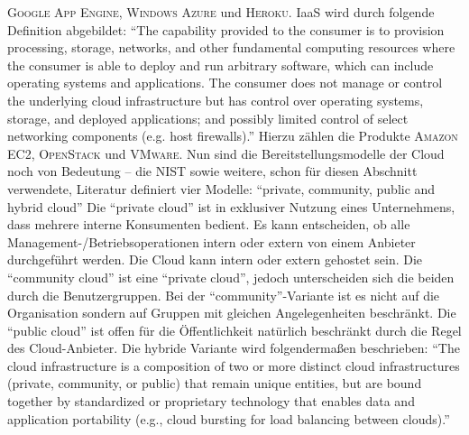 \textsc{Google App Engine}, \textsc{Windows Azure} und \textsc{Heroku}.\autocite[vgl.][S.8]{kumar_reliability_2018} \ac{IaaS} wird durch folgende Definition abgebildet: \enquote{The capability provided to the consumer is to provision processing, storage, networks, and other fundamental computing resources where the consumer is able to deploy and run arbitrary software, which can include operating systems and applications. The consumer does not manage or control the underlying cloud infrastructure but has control over operating systems, storage, and deployed applications; and possibly limited control of select networking components (e.g. host firewalls).}\autocite[][S.3]{mell_nist_2011} Hierzu zählen die Produkte \textsc{Amazon EC2}, \textsc{OpenStack} und \textsc{VMware}. Nun sind die Bereitstellungsmodelle der Cloud noch von Bedeutung -- die \ac{NIST} sowie weitere, schon für diesen Abschnitt verwendete, Literatur definiert vier Modelle: \enquote{private, community, public and hybrid cloud} Die \enquote{private cloud} ist in exklusiver Nutzung eines Unternehmens, dass mehrere interne Konsumenten bedient. Es kann entscheiden, ob alle Management-/Betriebsoperationen intern oder extern von einem Anbieter durchgeführt werden. Die Cloud kann intern oder extern gehostet sein. Die \enquote{community cloud} ist eine \enquote{private cloud}, jedoch unterscheiden sich die beiden durch die Benutzergruppen. Bei der \enquote{community}-Variante ist es nicht auf die Organisation sondern auf Gruppen mit gleichen Angelegenheiten beschränkt. Die \enquote{public cloud} ist offen für die Öffentlichkeit natürlich beschränkt durch die Regel des Cloud-Anbieter. Die hybride Variante wird folgendermaßen beschrieben: \enquote{The cloud infrastructure is a composition of two or more distinct cloud infrastructures (private, community, or public) that remain unique entities, but are bound together by standardized or proprietary technology that enables data and application portability (e.g., cloud bursting for load balancing between clouds).}\autocite[][S.3]{mell_nist_2011}



